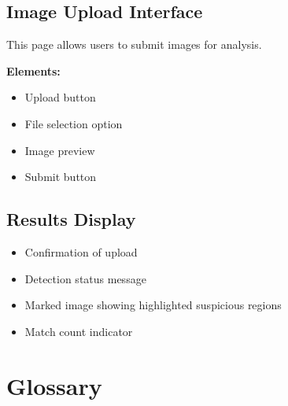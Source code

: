\documentclass[12pt]{article}
\begin{document}
\subsection{Image Upload Interface}

This page allows users to submit images for analysis.

\textbf{Elements:}
\begin{itemize}[noitemsep]
    \item Upload button
    \item File selection option
    \item Image preview
    \item Submit button
\end{itemize}

\subsection{Results Display}

\begin{itemize}[noitemsep]
    \item Confirmation of upload
    \item Detection status message
    \item Marked image showing highlighted suspicious regions
    \item Match count indicator
\end{itemize}

\section{Glossary}
\end{document}
